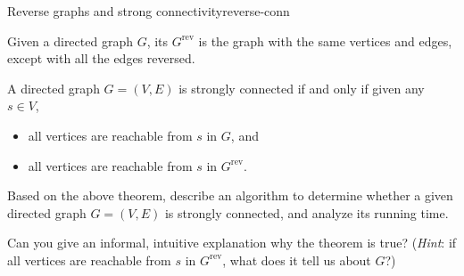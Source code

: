 \documentclass{tufte-handout}
\begin{document}


\begin{model*}{Reverse graphs and strong connectivity}{reverse-conn}

\begin{defn}
  Given a directed graph $G$, its 
  $G^{\mathrm{rev}}$ is the graph with the same vertices and edges,
  except with all the edges reversed.
\end{defn}

\begin{thm} \label{thm:conn-rev}
  A directed graph $G = (V,E)$ is strongly connected if and only if
  given any $s \in V$,
  \begin{itemize}
  \item all vertices are reachable from $s$ in $G$, and
  \item all vertices are reachable from $s$ in $G^{\mathrm{rev}}$.
  \end{itemize}

\end{thm}
\end{model*}


\begin{questions}
\item Based on the above theorem, describe an algorithm to determine
  whether a given directed graph $G = (V,E)$ is strongly connected,
  and analyze its running time. \vspace{2in}

\item Can you give an informal, intuitive explanation why the theorem
  is true? (\emph{Hint}: if all vertices are reachable from $s$ in
  $G^{\mathrm{rev}}$, what does it tell us about $G$?)
\end{questions}
\end{document}
